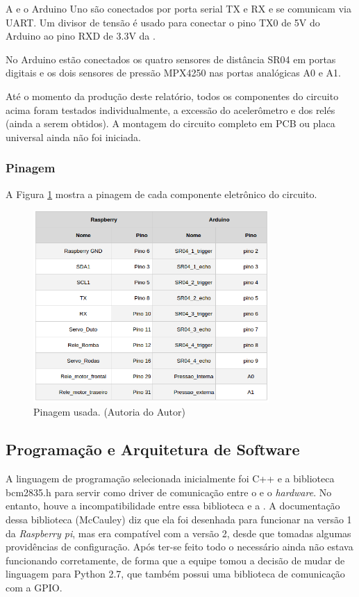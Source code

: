 A  e o Arduino Uno são conectados por porta serial TX e RX e se comunicam via \textsf{UART}. Um divisor de tensão é usado para conectar o pino TX0 de 5V do Arduino ao pino RXD de 3.3V da .

No Arduino estão conectados os quatro sensores de distância SR04 em portas digitais e os dois sensores de pressão MPX4250 nas portas analógicas A0 e A1.

Até o momento da produção deste relatório, todos os componentes do circuito acima foram testados individualmente, a excessão do acelerômetro e dos relés (ainda a serem obtidos). A montagem do circuito completo em PCB ou placa universal ainda não foi iniciada.

\subsubsection{Pinagem}
A Figura \ref{fig:pinout} mostra a pinagem de cada componente eletrônico do circuito.
\par
\begin{figure}[h]
  \centering
  \includegraphics[width=0.8\textwidth]{figures/pinout.png}
  \caption{Pinagem usada. (\textsf{Autoria do Autor)}}
  \label{fig:pinout}
\end{figure}
\FloatBarrier
\par

\subsection{Programação e Arquitetura de Software}
A linguagem de programação selecionada inicialmente foi C++ e a biblioteca \textsf{bcm2835.h} para servir como driver de comunicação entre o \software e o \textit{hardware}. No entanto, houve a incompatibilidade entre essa biblioteca e a . A documentação dessa biblioteca (McCauley) diz que ela foi desenhada para funcionar na versão 1 da \textit{Raspberry pi}, mas era compatível com a versão 2, desde que tomadas algumas providências de configuração. Após ter-se feito todo o necessário ainda não estava funcionando corretamente, de forma que a equipe tomou a decisão de mudar de linguagem para \textsf{Python 2.7}, que também possui uma biblioteca de comunicação com a GPIO.

